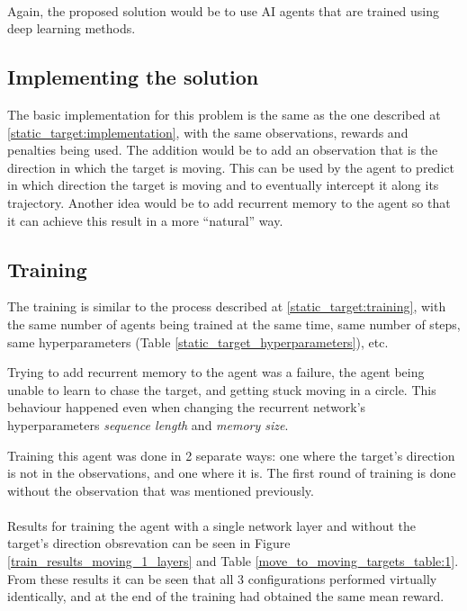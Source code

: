 \paragraph{}
Again, the proposed solution would be to use AI agents that are trained using deep learning methods.

\subsection{Implementing the solution} \label{moving_target:implementation}
The basic implementation for this problem is the same as the one described at \ref{static_target:implementation}, with the same observations, rewards and penalties being used. The addition would be to add an observation that is the direction in which the target is moving. This can be used by the agent to predict in which direction the target is moving and to eventually intercept it along its trajectory. Another idea would be to add recurrent memory to the agent so that it can achieve this result in a more \enquote{natural} way.

\subsection{Training} \label{moving_target:training}
The training is similar to the process described at \ref{static_target:training}, with the same number of agents being trained at the same time, same number of steps, same hyperparameters (Table \ref{static_target_hyperparameters}), etc. 

Trying to add recurrent memory to the agent was a failure, the agent being unable to learn to chase the target, and getting stuck moving in a circle. This behaviour happened even when changing the recurrent network's hyperparameters \emph{sequence length} and \emph{memory size}. %

Training this agent was done in 2 separate ways: one where the target's direction is not in the observations, and one where it is. The first round of training is done without the observation that was mentioned previously.

\paragraph{}
Results for training the agent with a single network layer and without the target's direction obsrevation can be seen in Figure \ref{train_results_moving_1_layers} and Table \ref{move_to_moving_targets_table:1}. From these results it can be seen that all 3 configurations performed virtually identically, and at the end of the training had obtained the same mean reward.

